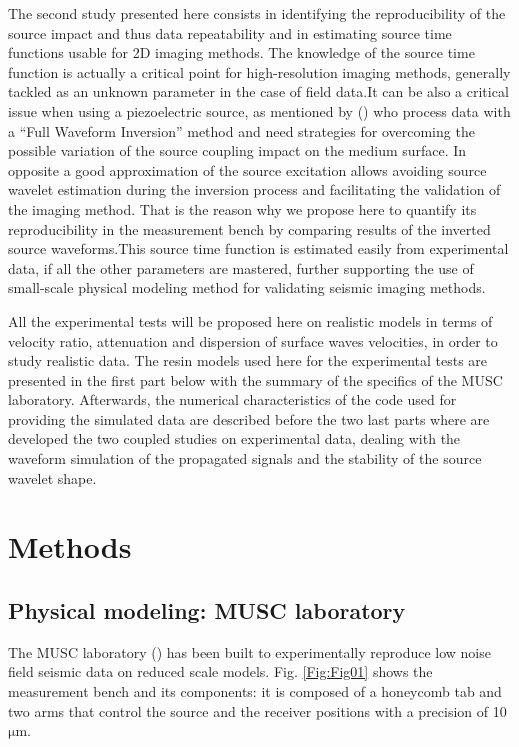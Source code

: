 \documentclass[extra,mreferee]{gji}
\begin{document}
The second study presented here consists in identifying the reproducibility of the source impact and thus data repeatability and in estimating source time functions usable for 2D imaging methods. The knowledge of the source time function is actually a critical point for high-resolution imaging methods, generally tackled as an unknown parameter in the case of field data.It can be also a critical issue when using a piezoelectric source, as mentioned by (\cite{kohn2016application}) who process data with a “Full Waveform Inversion” method and need strategies for overcoming the possible variation of the source coupling impact on the medium surface. In opposite a good approximation of the source excitation allows avoiding source wavelet estimation during the inversion process and facilitating the validation of the imaging method. That is the reason why we propose here to quantify its reproducibility in the measurement bench by comparing results of the inverted source waveforms.This source time function is estimated easily from experimental data, if all the other parameters are mastered, further supporting the use of small-scale physical modeling method for validating seismic imaging methods.

All the experimental tests will be proposed here on realistic models in terms of velocity ratio, attenuation and dispersion of surface waves velocities, in order to study realistic data. The resin models used here for the experimental tests are presented in the first part below with the summary of the specifics of the MUSC laboratory. Afterwards, the numerical characteristics of the code used for providing the simulated data are described before the two last parts where are developed the two coupled studies on experimental data, dealing with the waveform simulation of the propagated signals and the stability of the source wavelet shape.


\normalfont

\section{Methods}

\subsection{Physical modeling: MUSC laboratory}

The MUSC laboratory (\cite{bretaudeau_ssa_2008b,bretaudeau2011ssm,bretaudeau2013fwi}) has been built to experimentally reproduce low noise field seismic data on reduced scale models. Fig. \ref{Fig:Fig01} shows the measurement bench and its components: it is composed of a honeycomb tab and two arms that control the source and the receiver positions with a precision of 10 $\mathrm{\mu m}$.
\end{document}
